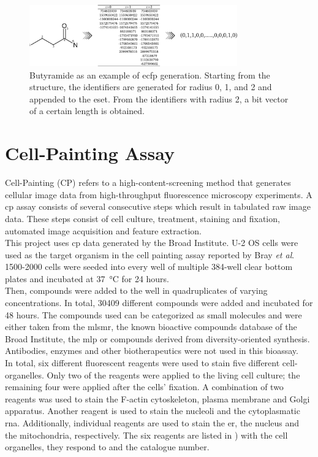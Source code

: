 \begin{figure}[H]
	\centering
	\includegraphics[width=0.8\textwidth]{figures/ecfp_process.pdf}
	\caption[Visualization of \ac{ecfp} Generation]{Butyramide as an example of \ac{ecfp} generation. Starting from the structure, the identifiers are generated for radius 0, 1, and 2 and appended to the \acl{eset}. From the identifiers with radius 2, a bit vector of a certain length is obtained.}
	\label{fig:ecfpprocess}
\end{figure}
\section{Cell-Painting Assay}\label{sec:cpassay}
Cell-Painting (CP) refers to a high-content-screening method that generates cellular image data from high-throughput fluorescence microscopy experiments. A \ac{cp} assay consists of several consecutive steps which result in tabulated raw image data. These steps consist of cell culture, treatment, staining and fixation, automated image acquisition and feature extraction.\cite{Bray2017}\\
This project uses \ac{cp} data generated by the Broad Institute\cite{Bray2017}. U-2 OS cells were used as the target organism in the cell painting assay reported by Bray \textit{et al}.\cite{Bray2017} 1500-2000 cells were seeded into every well of multiple 384-well clear bottom plates and incubated at \SI{37}{\degreeCelsius} for 24 hours.\cite{Wawer2014}\\
Then, compounds were added to the well in quadruplicates of varying concentrations. In total, 30409 different compounds were added and incubated for 48 hours. The compounds used can be categorized as small molecules and were either taken from the \ac{mlsmr}, the known bioactive compounds database of the Broad Institute, the \ac{mlp} or compounds derived from diversity-oriented synthesis. Antibodies, enzymes and other biotherapeutics were not used in this bioassay.\cite{Bray2017}\\
In total, six different fluorescent reagents were used to stain five different cell-organelles. Only two of the reagents were applied to the living cell culture; the remaining four were applied after the cells' fixation. A combination of two reagents was used to stain the F-actin cytoskeleton, plasma membrane and Golgi apparatus. Another reagent is used to stain the nucleoli and the cytoplasmatic \ac{rna}. Additionally, individual reagents are used to stain the \ac{er}, the nucleus and the mitochondria, respectively. The six reagents are listed in ) with the cell organelles, they respond to and the catalogue number.
